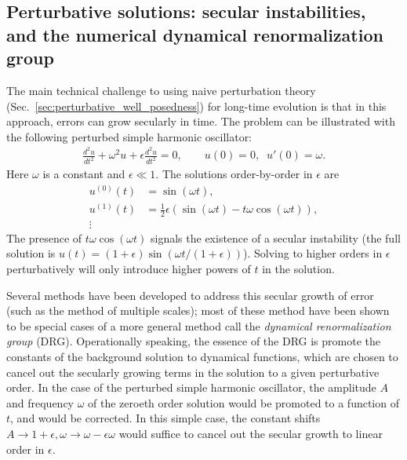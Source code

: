 \documentclass{ws-ijmpd}
\begin{document}
\subsection{Perturbative solutions: secular instabilities, 
and the numerical dynamical renormalization group
\label{sec:perturbative_secular_instabilities}
}
The main technical challenge to using naive perturbation theory
(Sec.~\ref{sec:perturbative_well_posedness})
for long-time evolution
is that in this approach, 
errors can grow secularly in time\cite{bender2013advanced}.
The problem can be illustrated with the following perturbed
simple harmonic oscillator:
\begin{align}
   \frac{d^2 u}{dt^2} + \omega^2 u + \epsilon \frac{d^2u}{dt^2}
   =
   0
   ,\qquad
   u(0) = 0
   ,\;\;
   u'(0) = \omega
   .
\end{align}
Here $\omega$ is a constant and $\epsilon\ll1$.
The solutions order-by-order in $\epsilon$ are
\begin{subequations}
\begin{align}
   u^{(0)}(t)
   &=
   \sin\left(\omega t\right)
   ,\\
   u^{(1)}(t)
   &=
   \frac{1}{2}\epsilon\left(
      \sin\left(\omega t\right)
      -
      t\omega\cos\left(\omega t\right)
   \right)
   ,\\
   \vdots\nonumber
\end{align}
\end{subequations}
The presence of $t\omega \cos\left(\omega t\right)$ signals
the existence of a secular instability (the full
solution is $u(t) = \left(1+\epsilon\right)
\sin\left(\omega t/\left(1+\epsilon\right)\right)$).
Solving to higher orders in $\epsilon$ perturbatively will only
introduce higher powers of $t$ in the solution.

Several methods have been developed to address this secular growth of
error (such as the method of multiple 
scales\cite{bender2013advanced,kevorkian2012multiple}); 
most of these method have been shown to be special cases
of a more general method call
the \emph{dynamical renormalization group} (DRG)\cite{Chen:1995ena,
Kunihiro:1995zt,10.1143/PTPS.99.244,Ei:1999pk}.
Operationally speaking, the essence of the DRG is promote
the constants of the background solution to dynamical functions,
which are chosen to cancel out the secularly growing terms
in the solution to a given perturbative order.
In the case of the perturbed simple harmonic oscillator,
the amplitude $A$ and frequency $\omega$ of the zeroeth order solution 
would be promoted to a function of $t$, and would be corrected. 
In this simple case, the constant shifts 
$A\to1 + \epsilon, \omega \to \omega - \epsilon\omega $ would suffice
to cancel out the secular growth to linear order in $\epsilon$.
\end{document}
